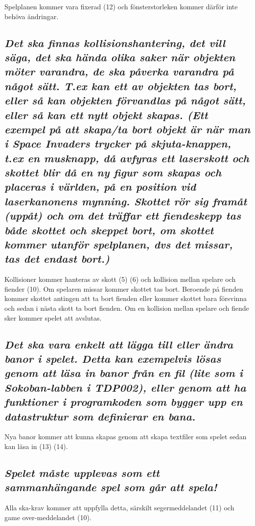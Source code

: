 \documentclass{TDP005mall}
\begin{document}
Spelplanen kommer vara fixerad (12) och fönsterstorleken kommer därför inte behöva ändringar.

\subsection{\textit{Det ska finnas kollisionshantering, det vill säga, det ska hända olika saker när objekten möter varandra, de ska påverka varandra på något sätt. T.ex kan ett av objekten tas bort, eller så kan objekten förvandlas på något sätt, eller så kan ett nytt objekt skapas. (Ett exempel på att skapa/ta bort objekt är när man i Space Invaders trycker på skjuta-knappen, t.ex en musknapp, då avfyras ett laserskott och skottet blir då en ny figur som skapas och placeras i världen, på en position vid laserkanonens mynning. Skottet rör sig framåt (uppåt) och om det träffar ett fiendeskepp tas både skottet och skeppet bort, om skottet kommer utanför spelplanen, dvs det missar, tas det endast bort.)}}

Kollisioner kommer hanteras av skott (5) (6) och kollision mellan spelare och fiender (10). Om spelaren missar kommer skottet tas bort. Beroende på fienden kommer skottet antingen att ta bort fienden eller kommer skottet bara försvinna och sedan i nästa skott ta bort fienden. Om en kollision mellan spelare och fiende sker kommer spelet att avslutas.

\subsection{\textit{Det ska vara enkelt att lägga till eller ändra banor i spelet. Detta kan exempelvis lösas genom att läsa in banor från en fil (lite som i Sokoban-labben i TDP002), eller genom att ha funktioner i programkoden som bygger upp en datastruktur som definierar en bana.}}

Nya banor kommer att kunna skapas genom att skapa textfiler som spelet sedan kan läsa in (13) (14).

\subsection{\textit{Spelet måste upplevas som ett sammanhängande spel som går att spela!}}

Alla ska-krav kommer att uppfylla detta, särskilt segermeddelandet (11) och game over-meddelandet (10).
\end{document}
